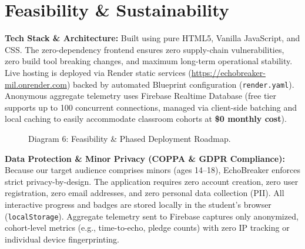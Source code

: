 \documentclass[11pt, a4paper]{article}
\begin{document}
\section{Feasibility \& Sustainability}

\textbf{Tech Stack \& Architecture:} Built using pure HTML5, Vanilla JavaScript, and CSS. The zero-dependency frontend ensures zero supply-chain vulnerabilities, zero build tool breaking changes, and maximum long-term operational stability. Live hosting is deployed via Render static services (\url{https://echobreaker-mil.onrender.com}) backed by automated Blueprint configuration (\texttt{render.yaml}). Anonymous aggregate telemetry uses Firebase Realtime Database (free tier supports up to 100 concurrent connections, managed via client-side batching and local caching to easily accommodate classroom cohorts at \textbf{\$0 monthly cost}).

\begin{figure}[htpb]
    \centering
    \caption{Diagram 6: Feasibility \& Phased Deployment Roadmap.}
    \label{fig:roadmap}
\end{figure}

\textbf{Data Protection \& Minor Privacy (COPPA \& GDPR Compliance):} Because our target audience comprises minors (ages 14--18), EchoBreaker enforces strict privacy-by-design. The application requires zero account creation, zero user registration, zero email addresses, and zero personal data collection (PII). All interactive progress and badges are stored locally in the student's browser (\texttt{localStorage}). Aggregate telemetry sent to Firebase captures only anonymized, cohort-level metrics (e.g., time-to-echo, pledge counts) with zero IP tracking or individual device fingerprinting.
\end{document}
